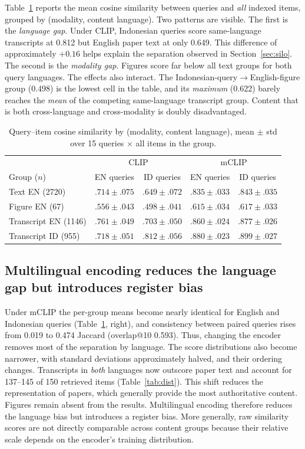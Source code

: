 \documentclass[conference]{IEEEtran}
\begin{document}
Table~\ref{tab:gap} reports the mean cosine similarity between queries and
\emph{all} indexed items, grouped by (modality, content language). Two
patterns are visible. The first is the \emph{language gap}. Under CLIP,
Indonesian queries score same-language transcripts at 0.812 but English
paper text at only 0.649. This difference of approximately $+0.16$ helps
explain the separation observed in Section~\ref{sec:silo}. The second is the
\emph{modality gap}. Figures score far below all text groups for both query
languages. The effects also interact. The
Indonesian-query$\to$English-figure group (0.498) is the
lowest cell in the table, and its \emph{maximum} (0.622) barely reaches the
\emph{mean} of the competing same-language transcript group. Content that
is both cross-language and cross-modality is doubly disadvantaged.

\begin{table}[t]
\centering
\caption{Query--item cosine similarity by (modality, content language),
mean $\pm$ std over 15 queries $\times$ all items in the group.}
\label{tab:gap}
\small
\begin{tabular}{lcccc}
\toprule
 & \multicolumn{2}{c}{CLIP} & \multicolumn{2}{c}{mCLIP}\\
Group ($n$) & EN queries & ID queries & EN queries & ID queries\\
\midrule
Text EN (2720)       & $.714 \pm .075$ & $.649 \pm .072$ & $.835 \pm .033$ & $.843 \pm .035$\\
Figure EN (67)       & $.556 \pm .043$ & $.498 \pm .041$ & $.615 \pm .034$ & $.617 \pm .033$\\
Transcript EN (1146) & $.761 \pm .049$ & $.703 \pm .050$ & $.860 \pm .024$ & $.877 \pm .026$\\
Transcript ID (955)  & $.718 \pm .051$ & $.812 \pm .056$ & $.880 \pm .023$ & $.899 \pm .027$\\
\bottomrule
\end{tabular}
\end{table}

\subsection{Multilingual encoding reduces the language gap but introduces
register bias}

Under mCLIP the per-group means become nearly identical for English and
Indonesian queries (Table~\ref{tab:gap}, right), and consistency between
paired queries rises from 0.019 to 0.474 Jaccard (overlap@10 0.593). Thus,
changing the encoder removes most of the separation by language. The score
distributions also become narrower, with standard deviations approximately
halved, and their ordering changes. Transcripts in \emph{both} languages
now outscore paper text and account for 137--145 of 150 retrieved items
(Table~\ref{tab:dist}). This shift reduces the representation of papers,
which generally provide the most authoritative content. Figures remain
absent from the results. Multilingual encoding therefore reduces the
language bias but introduces a register bias. More generally, raw
similarity scores are not directly comparable across content groups because
their relative scale depends on the encoder's training distribution.
\end{document}
